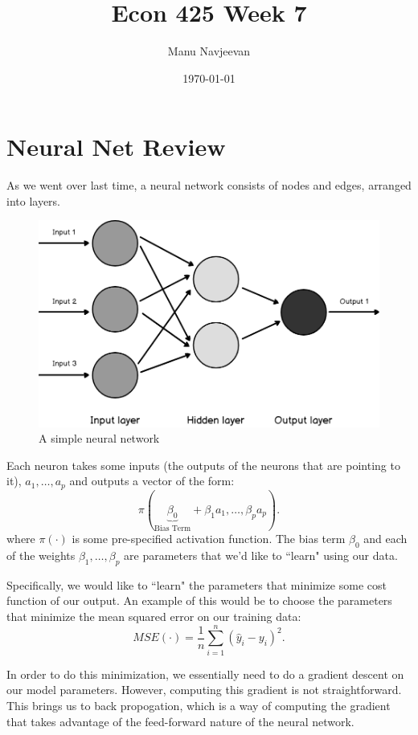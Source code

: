 \documentclass[10pt]{article}
\title{Econ 425 Week 7}%
\author{Manu Navjeevan}
\date{\today}
\begin{document}
\maketitle

\section{Neural Net Review}%
\label{sec:review}

As we went over last time, a neural network consists of nodes and edges, arranged into layers.
\begin{figure}[htpb]
	\centering
	\includegraphics[width=0.8\linewidth]{neural-three.png}
	\caption{A simple neural network}%
	\label{fig:neural-three}
\end{figure}

Each neuron takes some inputs (the outputs of the neurons that are pointing to it), \(a_1,\dots,a_p\) and outputs a vector of the form:
\[
	\pi\left(\underbrace{\beta_0}_{\text{Bias Term}} + \beta_1 a_1,\dots,\beta_p a_p\right)
.\] 
where \(\pi(\cdot)\) is some pre-specified activation function. The bias term  \(\beta_0\) and each of the weights  \(\beta_1,\dots,\beta_p\) are parameters that we'd like to ``learn" using our data.

Specifically, we would like to ``learn" the parameters that minimize some cost function of our output. An example of this would be to choose the parameters that minimize the mean squared error on our training data:
\[
	MSE\left(\cdot\right) = \frac{1}{n}\sum_{i=1}^n \left(\widehat{y}_i - y_i\right)^2 
.\] 

In order to do this minimization, we essentially need to do a gradient descent on our model parameters. However, computing this gradient is not straightforward. This brings us to back propogation, which is a way of computing the gradient that takes advantage of the feed-forward nature of the neural network.  
\end{document}
